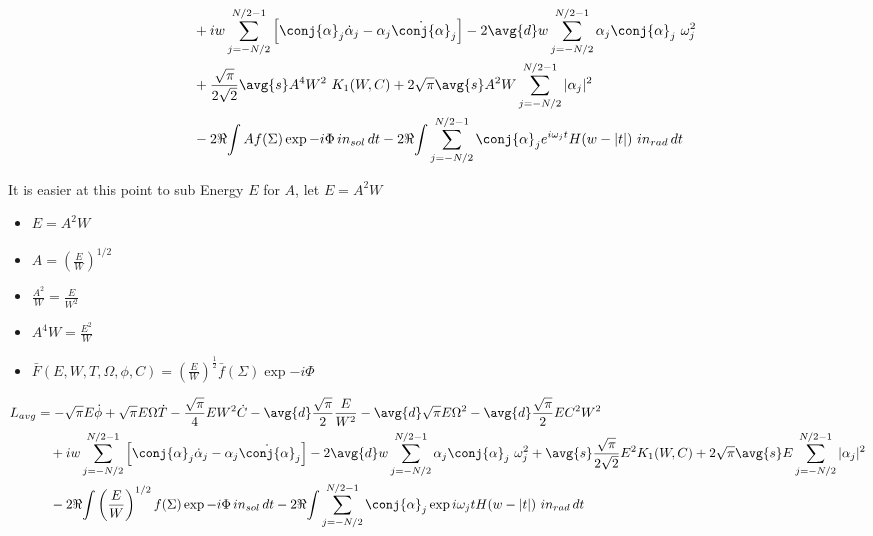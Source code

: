 \begin{equation}
\begin{split}
&\quad + iw \sum_{j=-N/2}^{N/2 - 1} \left[\conj{\alpha}_j \dot{\alpha}_j - \alpha_j \dot{\conj{\alpha}}_j\right] - 2 \avg{d} w \sum_{j=-N/2}^{N/2 - 1} \alpha_j \conj{\alpha}_j \ \omega_j^2 \\
&\quad + \frac{\sqrt{\pi}}{2\sqrt{2}} \avg{s} A^4W^2\ K_1(W,C) + 2\sqrt{\pi} \avg{s} A^2 W  \sum_{j=-N/2}^{N/2 - 1} |\alpha_j|^2 \\
&\quad - 2\Re{\int{A f(\Sigma) \exp{-i\Phi} \, in_{sol}\,dt}} - 2\Re{\int{\sum_{j=-N/2}^{N/2 - 1}\conj{\alpha}_j e^{i \omega_j t} H(w-|t|)\ in_{rad}\,dt}}\\
\end{split}
\end{equation}


It is easier at this point to sub Energy $E$ for $A$, let $E = A^2W$
\begin{itemize}
 \item $E = A^2W$
 \item $A = \left(\frac{E}{W}\right)^{1/2}$ 
 \item $\frac{A^2}{W} = \frac{E}{W^2}$
 \item $A^4 W = \frac{E^2}{W} $
 \item $\bar{F}(E,W,T,\Omega,\phi,C) = \left(\frac{E}{W}\right)^{\frac{1}{2}}\bar{f}(\Sigma)\exp{-i\Phi}$
\end{itemize}

\begin{equation}
\begin{split}
L_{avg} &= -\sqrt{\pi} E \dot{\phi} + \sqrt{\pi} E \Omega\dot{T} - \frac{\sqrt{\pi}}{4} E W^2\dot{C} - \avg{d} \frac{\sqrt{\pi}}{2} \frac{E}{W^2} - \avg{d}\sqrt{\pi} E \Omega^2 - \avg{d}\frac{\sqrt{\pi}}{2} E C^2 W^2\\
&\quad + iw \sum_{j=-N/2}^{N/2 - 1} \left[\conj{\alpha}_j \dot{\alpha}_j - \alpha_j \dot{\conj{\alpha}}_j\right] - 2 \avg{d} w \sum_{j=-N/2}^{N/2 - 1} \alpha_j \conj{\alpha}_j \ \omega_j^2 + \avg{s} \frac{\sqrt{\pi}}{2\sqrt{2}} E^2 K_1(W,C) + 2\sqrt{\pi}\avg{s} E  \sum_{j=-N/2}^{N/2 - 1} |\alpha_j|^2 \\
&\quad - 2\Re{\int{\left(\frac{E}{W}\right)^{1/2} f(\Sigma) \exp{-i\Phi} \, in_{sol}\,dt}} - 2\Re{\int{\sum_{j=-N/2}^{N/2 - 1}\conj{\alpha}_j \exp{i \omega_j t} H(w-|t|)\ in_{rad}\,dt}}\\
\end{split}
\end{equation}




